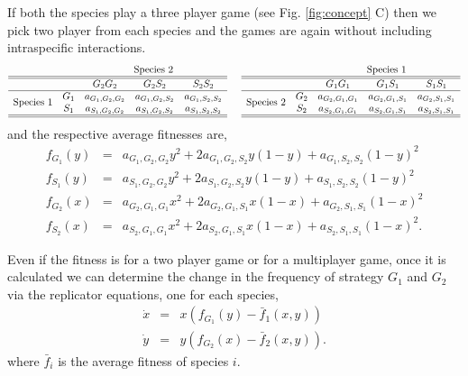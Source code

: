\documentclass[aps,pre,amsfonts,floatfix, onecolumn,showkeys]{revtex4-1}
\begin{document}
If both the species play a three player game (see Fig. \ref{fig:concept} C) then we pick two player from each species and the games are again without including intraspecific interactions.
\begin{equation}\label{}
\begin{array}{ccccc}
& & \multicolumn{3}{c}{\text{Species 2}}\\
\hline\hline
& & G_2 G_2	&	G_2 S_2		&	S_2 S_2\\
\hline
 \multirow{2}{*}{Species 1} & G_1 	& a_{G_1,G_2,G_2} &	a_{G_1,G_2,S_2} &	a_{G_1,S_2,S_2} 
 \\
 & S_1 	&  a_{S_1,G_2,G_2} &a_{S_1,G_2,S_2}  &a_{S_1,S_2,S_2} \\
 \hline\hline
\end{array}
\hspace{0.5cm}
\begin{array}{ccccc}
& & \multicolumn{3}{c}{\text{Species 1}}\\
\hline\hline
& & G_1 G_1	&	G_1 S_1		&	S_1 S_1\\
\hline
 \multirow{2}{*}{Species 2} & G_2	& a_{G_2,G_1,G_1} &	a_{G_2,G_1,S_1} &	a_{G_2,S_1,S_1} 
 \\
 & S_2 	&  a_{S_2,G_1,G_1} &a_{S_2,G_1,S_1}  &a_{S_2,S_1,S_1} \nonumber \\
 \hline\hline
\end{array}
\end{equation}
and the respective average fitnesses are,
\begin{eqnarray}
f_{G_1} (y) &=& a_{G_1,G_2,G_2} y^2 + 2 a_{G_1,G_2,S_2} y (1-y) + a_{G_1,S_2,S_2} (1-y)^2  \nonumber \\
f_{S_1} (y) &=& a_{S_1,G_2,G_2} y^2 + 2 a_{S_1,G_2,S_2} y (1-y) + a_{S_1,S_2,S_2} (1-y)^2  \\
f_{G_2} (x) &=& a_{G_2,G_1,G_1} x^2 + 2 a_{G_2,G_1,S_1} x (1-x) + a_{G_2,S_1,S_1} (1-x)^2 \nonumber \\ 
f_{S_2} (x) &=& a_{S_2,G_1,G_1} x^2 + 2 a_{S_2,G_1,S_1} x (1-x) + a_{S_2,S_1,S_1} (1-x)^2.
\end{eqnarray}

Even if the fitness is for a two player game or for a multiplayer game, once it is calculated we can determine the change in the frequency of strategy $G_1$ and $G_2$ via the replicator equations, one for each species,
\begin{eqnarray}
\dot{x} &=& x \left(f_{G_1}(y) -  \bar{f}_1(x,y) \right) \nonumber \\
\dot{y} &=& y \left(f_{G_2}(x) -  \bar{f}_2(x,y) \right).
\end{eqnarray}
where $\bar{f}_i$ is the average fitness of species $i$.
\end{document}
